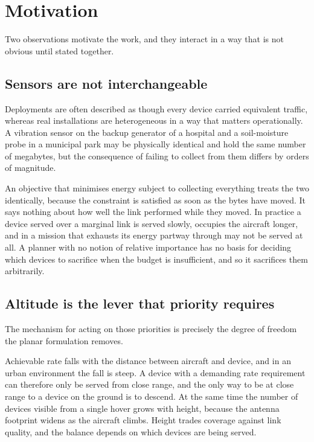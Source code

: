 \section{Motivation}

Two observations motivate the work, and they interact in a way that is not obvious until stated together.

\subsection{Sensors are not interchangeable}

Deployments are often described as though every device carried equivalent traffic, whereas real installations are heterogeneous in a way that matters operationally. A vibration sensor on the backup generator of a hospital and a soil-moisture probe in a municipal park may be physically identical and hold the same number of megabytes, but the consequence of failing to collect from them differs by orders of magnitude.

An objective that minimises energy subject to collecting everything treats the two identically, because the constraint is satisfied as soon as the bytes have moved. It says nothing about how well the link performed while they moved. In practice a device served over a marginal link is served slowly, occupies the aircraft longer, and in a mission that exhausts its energy partway through may not be served at all. A planner with no notion of relative importance has no basis for deciding which devices to sacrifice when the budget is insufficient, and so it sacrifices them arbitrarily.

\subsection{Altitude is the lever that priority requires}

The mechanism for acting on those priorities is precisely the degree of freedom the planar formulation removes.

Achievable rate falls with the distance between aircraft and device, and in an urban environment the fall is steep. A device with a demanding rate requirement can therefore only be served from close range, and the only way to be at close range to a device on the ground is to descend. At the same time the number of devices visible from a single hover grows with height, because the antenna footprint widens as the aircraft climbs. Height trades coverage against link quality, and the balance depends on which devices are being served.

